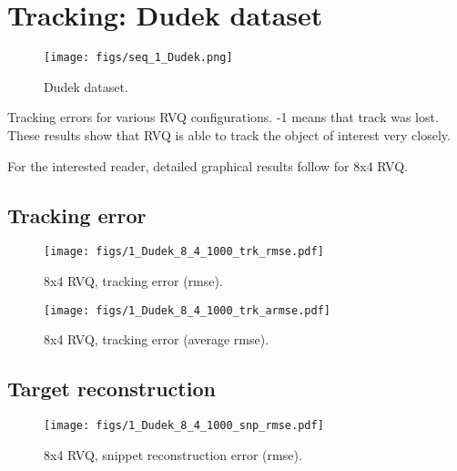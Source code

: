 \clearpage
\newpage
\section{Tracking: Dudek dataset} 
								\begin{figure}[h]
								\centering
								\texttt{[image: figs/seq\_1\_Dudek.png]}
								\caption{Dudek dataset.}
								\label{fig:seq_1_Dudek}
								\end{figure}



\begin{table}[h]
\centering

\caption{Tracking errors for various RVQ configurations.  -1 means that track was lost.  These results show that RVQ is able to track the object of interest very closely.}
\end{table}

For the interested reader, detailed graphical results follow for 8x4 RVQ.
\clearpage
\newpage
\subsection{Tracking error}

								\begin{figure}[h!]
								\centering
								\texttt{[image: figs/1\_Dudek\_8\_4\_1000\_trk\_rmse.pdf]}
								\caption{8x4 RVQ, tracking error (rmse).}
								\label{fig:1_Dudek_8_4_1000_trk_rmse}
								\end{figure}


								\begin{figure}[h!]
								\centering
								\texttt{[image: figs/1\_Dudek\_8\_4\_1000\_trk\_armse.pdf]}
								\caption{8x4 RVQ, tracking error (average rmse).}
								\label{fig:1_Dudek_8_4_1000_trk_avg_rmse}
								\end{figure}

\clearpage
\newpage
\subsection{Target reconstruction}

								\begin{figure}[h!]
								\centering
								\texttt{[image: figs/1\_Dudek\_8\_4\_1000\_snp\_rmse.pdf]}
								\caption{8x4 RVQ, snippet reconstruction error (rmse).}
								\label{fig:1_Dudek_8_4_1000_snp_rmse}
								\end{figure}


